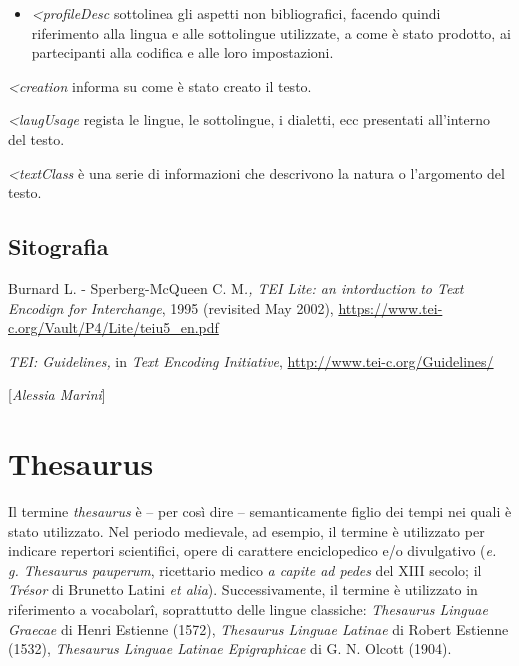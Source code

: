 {\begin{itemize}
\item
  \emph{\textless{}profileDesc} sottolinea gli aspetti non
  bibliografici, facendo quindi riferimento alla lingua e alle
  sottolingue utilizzate, a come è stato prodotto, ai partecipanti alla
  codifica e alle loro impostazioni.
\end{itemize}

\emph{\textless{}creation} informa su come è stato creato
il testo.

\emph{\textless{}laugUsage} regista le lingue, le
sottolingue, i dialetti, ecc presentati all'interno del testo.

\emph{\textless{}textClass} è una serie di informazioni
che descrivono la natura o l'argomento del testo.

\section*{Sitografia}
{\parindent0pt 
Burnard L. - Sperberg-McQueen C. M\emph{., TEI Lite: an intorduction to
Text Encodign for Interchange}, 1995 (revisited May 2002),
\url{https://www.tei-c.org/Vault/P4/Lite/teiu5_en.pdf}

\emph{TEI: Guidelines,} in \emph{Text Encoding Initiative},
\url{http://www.tei-c.org/Guidelines/}
}

\hrulefill 
 
{[}\emph{Alessia Marini}{]}

\chapter{Thesaurus}

Il termine \emph{thesaurus} è -- per così dire -- semanticamente figlio
dei tempi nei quali è stato utilizzato. Nel periodo medievale, ad
esempio, il termine è utilizzato per indicare repertori scientifici,
opere di carattere enciclopedico e/o divulgativo (\emph{e. g. Thesaurus
pauperum}, ricettario medico \emph{a capite ad pedes} del XIII secolo;
il \emph{Trésor} di Brunetto Latini \emph{et alia}). Successivamente, il
termine è utilizzato in riferimento a vocabolarî, soprattutto delle
lingue classiche: \emph{Thesaurus Linguae Graecae} di Henri Estienne
(1572), \emph{Thesaurus Linguae Latinae} di Robert Estienne (1532),
\emph{Thesaurus Linguae Latinae Epigraphicae} di G. N. Olcott (1904).

}
